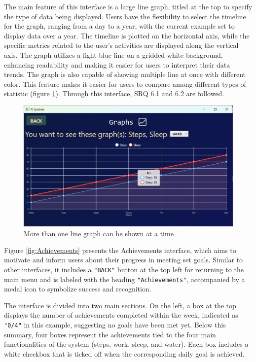 \documentclass[12pt]{article}
\begin{document}
The main feature of this interface is a large line graph, titled at the top to specify
the type of data being displayed. Users have the flexibility to select the timeline 
for the graph, ranging from a day to a year, with the current example set to display
data over a year. The timeline is plotted on the horizontal axis, while the specific
metrics related to the user’s activities are displayed along the vertical axis. The 
graph utilizes a light blue line on a gridded white background, enhancing readability
and making it easier for users to interpret their data trends. The graph is also capable of showing multiple line at once with different color. This feature makes it easier for users to compare among different types of statistic (figure \ref{fig:2_graphs}). Through this interface, SRQ 6.1 and 6.2 are followed.\par

\begin{figure}[h!]
  \centering
  \includegraphics[width = 0.5\linewidth]{2 line graph}
  \caption{More than one line graph can be shown at a time}
  \label{fig:2_graphs}
\end{figure}

Figure \ref{fig:Achievements} presents the Achievements interface, which aims to motivate
and inform users about their progress in meeting set goals. Similar to other interfaces,
it includes a \texttt{"BACK"} button at the top left for returning to the main menu and is labeled
with the heading \texttt{"Achievements"}, accompanied by a medal icon to symbolize success and recognition.\par

The interface is divided into two main sections. On the left, a box at the top displays
the number of achievements completed within the week, indicated as \texttt{"0/4"} in this example,
suggesting no goals have been met yet. Below this summary, four boxes represent the 
achievements tied to the four main functionalities of the system (steps, work, sleep, and
water). Each box includes a white checkbox that is ticked off when the corresponding daily
goal is achieved.\par
\end{document}
